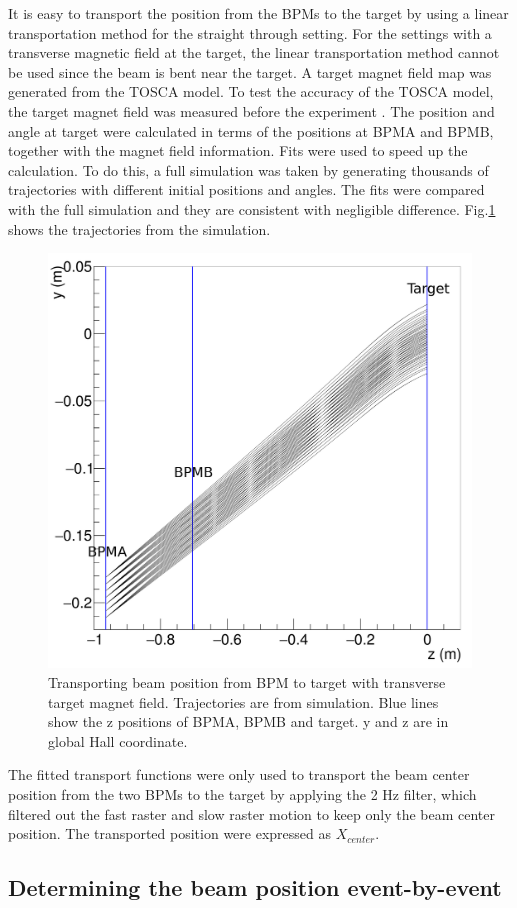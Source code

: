 \documentclass[english,review,number,sort&compress]{elsarticle}
\begin{document}
It is easy to transport the position from the BPMs to the target by using a linear transportation method for the straight through setting. For the settings with a transverse magnetic field at the target, the linear transportation method cannot be used since the beam is bent near the target. A target magnet field map \citep{winestosca} was generated from the TOSCA model. To test the accuracy of the TOSCA model, the target magnet field was measured before the experiment \citep{jiefieldmap,chaofieldmap}. The position and angle at target were calculated in terms of the positions at BPMA and BPMB, together with the magnet field information. Fits were used to speed up the calculation. To do this, a full simulation was taken by generating thousands of trajectories with different initial positions and angles. The fits were compared with the full simulation and they are consistent with negligible difference. Fig.\ref{fig:Transporting-beam-position} shows the trajectories from the simulation. 
\begin{figure}[tbph]
\begin{centering}
\includegraphics[width=0.4\columnwidth]{rastersize_target1} 
\par\end{centering}

\protect\caption{\label{fig:Transporting-beam-position}Transporting beam position from BPM to target with transverse target magnet field. Trajectories are from simulation. Blue lines show the z positions of BPMA, BPMB and target. y and z are in global Hall coordinate.}
\end{figure}


The fitted transport functions were only used to transport the beam center position from the two BPMs to the target by applying the 2 Hz filter, which filtered out the fast raster and slow raster motion to keep only the beam center position. The transported position were expressed as $X_{center}$.


\subsection{\label{sub:Det-ebe-pos}Determining the beam position event-by-event}
\end{document}
